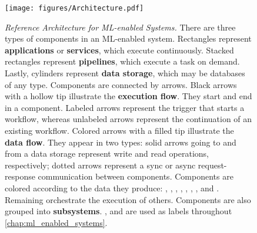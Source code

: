 \begin{figure}[p]
  \centering
  \texttt{[image: figures/Architecture.pdf]}
  \caption[%
    Reference Architecture for ML-enabled Systems
  ]{%
    \emph{Reference Architecture for ML-enabled Systems.}
    There are three types of components in an ML-enabled system.
    Rectangles represent \textbf{applications} or \textbf{services},
      which execute continuously.
    Stacked rectangles represent \textbf{pipelines},
      which execute a task on demand.
    Lastly, cylinders represent \textbf{data storage},
      which may be databases of any type.
    Components are connected by arrows.
    Black arrows with a hollow tip illustrate the \textbf{execution flow}.
      They start and end in a component.
      Labeled arrows represent the trigger that starts a workflow,
      whereas unlabeled arrows represent the continuation of an
      existing workflow.
    Colored arrows with a filled tip illustrate the \textbf{data flow}.
    They appear in two types:
      solid arrows going to and from a data storage represent
      write and read operations, respectively;
      dotted arrows represent a sync or async request-response
      communication between components.
    Components are colored according to the data they produce:
      \mbox{},
      \mbox{},
      \mbox{},
      \mbox{},
      \mbox{},
      \mbox{},
      \mbox{}, and
      \mbox{}.
      Remaining  orchestrate
      the execution of others.
    Components are also grouped into \textbf{subsystems}.
    ,
     and
    are used as labels throughout \cref{chap:ml_enabled_systems}.
  }
  \label{fig:reference_architecture}
\end{figure}

